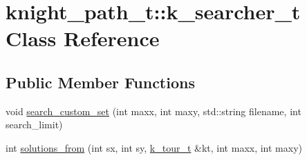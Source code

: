 \hypertarget{classknight__path__t_1_1k__searcher__t}{\section{knight\-\_\-path\-\_\-t\-:\-:k\-\_\-searcher\-\_\-t \-Class \-Reference}
\label{classknight__path__t_1_1k__searcher__t}
}
\subsection*{\-Public \-Member \-Functions}
\begin{DoxyCompactItemize}
\item 
void \hyperlink{classknight__path__t_1_1k__searcher__t_a8413a5bf3e38d9cec3ceff1c5a3d127a}{search\-\_\-custom\-\_\-set} (int maxx, int maxy, std\-::string filename, int search\-\_\-limit)
\item 
int \hyperlink{classknight__path__t_1_1k__searcher__t_a9d0df96514ddc9b347381752f296fc34}{solutions\-\_\-from} (int sx, int sy, \hyperlink{classknight__path__t_1_1k__tour__t}{k\-\_\-tour\-\_\-t} \&kt, int maxx, int maxy)
\end{DoxyCompactItemize}


